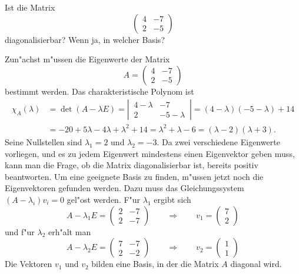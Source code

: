 Ist die Matrix
\[
\begin{pmatrix}
4&-7\\
2&-5
\end{pmatrix}
\]
diagonalisierbar? Wenn ja, in welcher Basis?

\begin{loesung}
Zun"achst m"ussen die Eigenwerte der Matrix
\[
A=
\begin{pmatrix}
4&-7\\
2&-5
\end{pmatrix}
\]
bestimmt werden. Das
charakteristische Polynom ist
\begin{align*}
\chi_A(\lambda)&=
\det(A-\lambda E)
=
\left|\,\begin{matrix}4-\lambda&-7\\2&-5-\lambda\end{matrix}\,\right|
=(4-\lambda)(-5-\lambda)+14\\
&=-20+5\lambda-4\lambda+\lambda^2+14
=\lambda^2+\lambda-6=(\lambda -2)(\lambda +3).
\end{align*}
Seine Nullstellen sind $\lambda_1=2$ und $\lambda_2=-3$. Da zwei
verschiedene Eigenwerte vorliegen, und es zu jedem Eigenwert
mindestens einen Eigenvektor geben muss, kann man die Frage, ob
die Matrix diagonalisierbar ist, bereits positiv beantworten. Um
eine geeignete Basis zu finden, m"ussen jetzt noch die Eigenvektoren
gefunden werden. Dazu muss das Gleichungssystem $(A-\lambda_i)v_i=0$
gel"ost werden. F"ur $\lambda_1$ ergibt sich
\[
A-\lambda_1 E=\begin{pmatrix}
2&-7\\
2&-7
\end{pmatrix}
\qquad \Rightarrow\qquad v_1=\begin{pmatrix}7\\2\end{pmatrix}
\]
und f"ur $\lambda_2$ erh"alt man
\[
A-\lambda_2 E=\begin{pmatrix}
7&-7\\
2&-2
\end{pmatrix}
\qquad \Rightarrow\qquad v_2=\begin{pmatrix}1\\1\end{pmatrix}
\]
Die Vektoren $v_1$ und $v_2$ bilden eine Basis, in der die Matrix $A$
diagonal wird.
\end{loesung}

